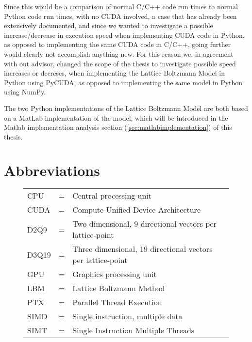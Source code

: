 Since this would be a comparison of normal C/C++ code run times to normal Python code run times, with no CUDA involved, a case that has already been extensively documented, and since we wanted to investigate a possible increase/decrease in execution speed when implementing CUDA code in Python, as opposed to implementing the same CUDA code in C/C++, going further would clearly not accomplish anything new. For this reason we, in agreement with out advisor, changed the scope of the thesis to investigate possible speed increases or decreses, when implementing the Lattice Boltzmann Model in Python using PyCUDA, as opposed to implementing the same model in Python using NumPy.

The two Python implementations of the Lattice Boltzmann Model are both based on a MatLab implementation of the model, which will be introduced in the Matlab implementation analysis section (\autoref{sec:matlabimplementation}) of this thesis.

\newpage

\section{Abbreviations}

\begin{figure}[htb]
\centering
	\begin{tabular}{lcl}
	    CPU & = & Central processing unit\\
	    CUDA & = & Compute Unified Device Architecture\\
		D2Q9 & = & Two dimensional, 9 directional vectors per lattice-point\\
		D3Q19 & = & Three dimensional, 19 directional vectors per lattice-point\\
		GPU & = & Graphics processing unit\\
		LBM & = & Lattice Boltzmann Method\\
		PTX & = & Parallel Thread Execution\\
		SIMD & = & Single instruction, multiple data\\
		SIMT & = & Single Instruction Multiple Threads
	\end{tabular}
\end{figure}

\newpage


\newpage


\newpage


\newpage


